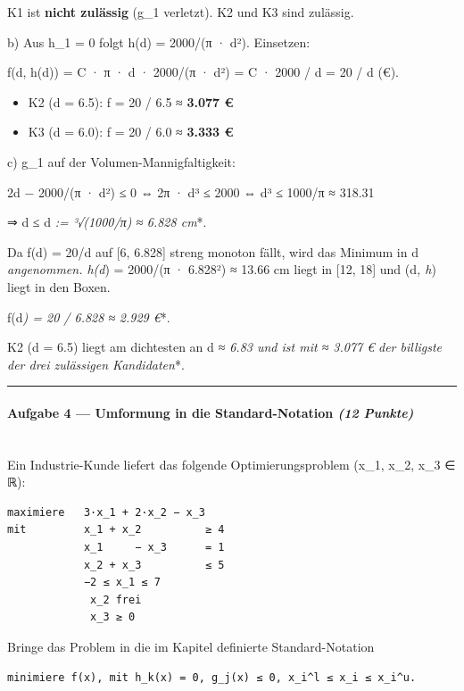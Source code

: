 \documentclass[11pt, a4paper]{article}
\begin{document}
K1 ist \textbf{nicht zulässig} (g\_1 verletzt). K2 und K3 sind zulässig.


b) Aus h\_1 = 0 folgt h(d) = 2000/(π · d²). Einsetzen:


f(d, h(d)) = C · π · d · 2000/(π · d²) = C · 2000 / d = 20 / d  (€).


\begin{itemize}
  \item K2 (d = 6.5): f = 20 / 6.5 ≈ \textbf{3.077 €}
  \item K3 (d = 6.0): f = 20 / 6.0 ≈ \textbf{3.333 €}
\end{itemize}

c) g\_1 auf der Volumen-Mannigfaltigkeit:


2d − 2000/(π · d²) ≤ 0  ⇔  2π · d³ ≤ 2000  ⇔  d³ ≤ 1000/π ≈ 318.31


⇒  d ≤ d\textit{ := ³√(1000/π) ≈ }\textit{6.828 cm}*.


Da f(d) = 20/d auf [6, 6.828] streng monoton fällt, wird das Minimum in d\textit{ angenommen. h(d}) = 2000/(π · 6.828²) ≈ 13.66 cm liegt in [12, 18] und (d\textit{, h}) liegt in den Boxen.


f(d\textit{) = 20 / 6.828 ≈ }\textit{2.929 €}*.


K2 (d = 6.5) liegt am dichtesten an d\textit{ ≈ 6.83 und ist mit ≈ 3.077 € }\textit{der billigste der drei zulässigen Kandidaten}*.



\noindent\textcolor{rulegray}{\rule{\linewidth}{0.4pt}}


\paragraph{Aufgabe 4 — Umformung in die Standard-Notation \textit{(12 Punkte)}}\mbox{}\\[2pt]

Ein Industrie-Kunde liefert das folgende Optimierungsproblem (x\_1, x\_2, x\_3 ∈ ℝ):


\begin{lstlisting}
maximiere   3·x_1 + 2·x_2 − x_3
mit         x_1 + x_2          ≥ 4
            x_1     − x_3      = 1
            x_2 + x_3          ≤ 5
            −2 ≤ x_1 ≤ 7
             x_2 frei
             x_3 ≥ 0
\end{lstlisting}


Bringe das Problem in die im Kapitel definierte Standard-Notation


\begin{lstlisting}
minimiere f(x), mit h_k(x) = 0, g_j(x) ≤ 0, x_i^l ≤ x_i ≤ x_i^u.
\end{lstlisting}
\end{document}
